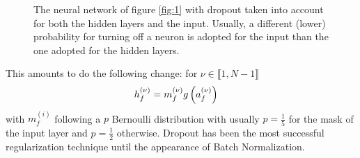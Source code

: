 \begin{figure}[H]
\begin{center}
\caption{\label{fig:2}The neural network of figure \ref{fig:1} with dropout taken into account for both the hidden layers and the input. Usually, a different (lower) probability for turning off a neuron is adopted for the input than the one adopted for the hidden layers.}
\end{center}
\end{figure}


This amounts to do the following change: for $\nu\in \llbracket 1,N-1\rrbracket$
\begin{align}
h^{(\nu)}_{f}=\null&m_f^{(\nu)} g\left(a_f^{(\nu)}\right)
\end{align}
with $m_f^{(i)}$ following a $p$ Bernoulli distribution with usually $p=\frac15$ for the mask of the input layer and $p=\frac12$ otherwise. Dropout\cite{Srivastava:2014:DSW:2627435.2670313} has been the most successful regularization technique until the appearance of Batch Normalization. 

